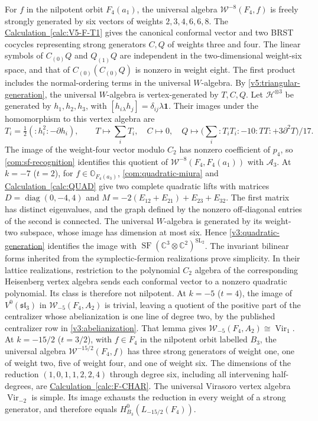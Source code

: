 \documentclass[11pt,a4paper]{amsart}
\numberwithin{equation}{section}
\theoremstyle{definition}
\theoremstyle{remark}
\newcommand{\C}{\mathbb C}
\newcommand{\OO}{\mathbb O}
\newcommand{\slg}{\mathfrak{sl}}
\newcommand{\SF}{\operatorname{SF}}
\newcommand{\Vir}{\operatorname{Vir}}
\begin{document}
For $f$ in the nilpotent orbit $F_4(a_1)$, the universal algebra
$\mathcal W^{-8}(F_4,f)$ is freely strongly generated by six vectors
of weights $2,3,4,6,6,8$.
The \hyperref[calc:V5-F-T1]{Calculation~\ref*{calc:V5-F-T1}} gives the canonical conformal vector
and two BRST cocycles representing strong generators $C,Q$ of weights three and four.
The linear symbols of $C_{(0)}Q$ and $Q_{(1)}Q$ are independent in the
two-dimensional weight-six space, and that of
$C_{(0)}(C_{(0)}Q)$ is nonzero in weight eight. The first product
includes the normal-ordering terms in the universal $W$-algebra.
By \cref{v5:triangular-generation}, the universal $W$-algebra is vertex-generated
by $T,C,Q$. Let $\mathcal H^{\otimes3}$ be generated by
$h_1,h_2,h_3$, with $[h_i{}_{\lambda}h_j]=\delta_{ij}\lambda\mathbf1$.
Their images under the homomorphism to this vertex algebra are
$$
 T_i=\tfrac12(:h_i^2:-\partial h_i),\qquad T\longmapsto\sum_iT_i,
 \quad C\longmapsto0,\quad
 Q\longmapsto\bigl(\sum_i:T_iT_i:-10:TT:+3\partial^2T\bigr)/17.
$$
The image of the weight-four vector modulo $C_2$ has nonzero
coefficient of $p_4$, so
\cref{com:sf-recognition} identifies this quotient of
$\mathcal W^{-8}(F_4,F_4(a_1))$ with $\mathcal A_3$.
At $k=-7$ ($t=2$), for $f\in\OO_{F_4(a_3)}$, \cref{com:quadratic-miura} and
\hyperref[calc:QUAD]{Calculation~\ref*{calc:QUAD}} give two complete
quadratic lifts with matrices
$D=\operatorname{diag}(0,-4,4)$ and
$M=-2(E_{12}+E_{21})+E_{23}+E_{32}$.
The first matrix has distinct eigenvalues, and the graph defined by the
nonzero off-diagonal entries of the second is connected. The universal
$W$-algebra is generated by its weight-two subspace, whose image has
dimension at most six. Hence \cref{v3:quadratic-generation} identifies
the image with $\SF(\C^3\otimes\C^2)^{\mathrm{SL}_2}$.
The invariant bilinear forms inherited from the symplectic-fermion
realizations prove simplicity. In their lattice realizations, restriction
to the polynomial $C_2$ algebra of the corresponding Heisenberg vertex
algebra sends each conformal vector to a nonzero quadratic polynomial.
Its class is therefore not nilpotent.
At $k=-5$ ($t=4$), the image of $V^0(\slg_3)$ in
$\mathcal W_{-5}(F_4,A_2)$ is trivial, leaving a quotient of the positive part of the centralizer
whose abelianization is one line of degree two, by the published
centralizer row in \cref{v3:abelianization}. That lemma gives
$\mathcal W_{-5}(F_4,A_2)\cong\Vir_1$.
At $k=-15/2$ ($t=3/2$), with $f\in F_4$ in the nilpotent orbit labelled $B_3$,
the universal algebra
$\mathcal W^{-15/2}(F_4,f)$ has three strong generators of weight one,
one of weight two, five of weight four, and one of weight six.
The dimensions of the reduction $(1,0,1,1,2,2,4)$ through degree six,
including all intervening half-degrees, are \hyperref[calc:F-CHAR]{Calculation~\ref*{calc:F-CHAR}}.
The universal Virasoro vertex algebra $\Vir_{-2}$ is simple.
Its image exhausts the reduction in every weight of a strong generator,
and therefore equals $H^0_{B_3}(L_{-15/2}(F_4))$.
\end{document}
